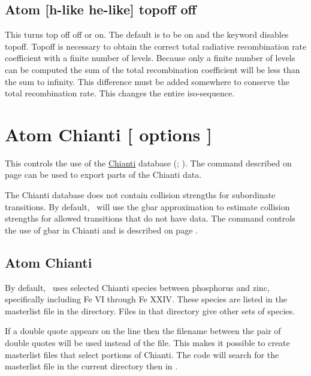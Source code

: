 \subsection{Atom [h-like \OR{} he-like] topoff off} 

This turns top off off or on.
The default is to be on and the keyword  disables topoff.
Topoff is necessary to obtain the correct total
radiative recombination rate coefficient with a finite number of levels.
Because only a finite number of levels can be computed the sum
of the total
recombination coefficient will be less than the sum to infinity.
This difference must be added somewhere to conserve the
total recombination rate.  
This changes the entire iso-sequence.

\section{Atom Chianti [ options ]}
\label{sec:SetChianti}

This controls the use of the 
\href{http://www.chiantidatabase.org/}{Chianti} database 
(\cite{Dere.K97CHIANTI---an-atomic-database-for-emission}; \cite{Landi2012}).
The  command described on 
page \pageref{sec:CommandSaveChianti} can be used to export parts of 
the Chianti data.

The Chianti database does not contain collision strengths for subordinate transitions.
By default, \Cloudy\ will use the gbar approximation to estimate collision strengths for allowed transitions that do not have data. 
The  command controls the use of gbar in Chianti and is described on page \pageref{sec:Setgbar}.

\subsection{Atom Chianti }
By default, \Cloudy\ uses selected Chianti species between phosphorus and zinc, 
specifically including Fe VI through Fe XXIV.
These species are listed in the  masterlist file in the 
 directory.
Files in that directory give other sets of species.

If a double quote appears on the line then the filename
between the pair of double quotes will be used instead of
the  file.
This makes it possible to create masterlist files that select portions
of Chianti.
The code will search for the masterlist file in the current directory then in
.

